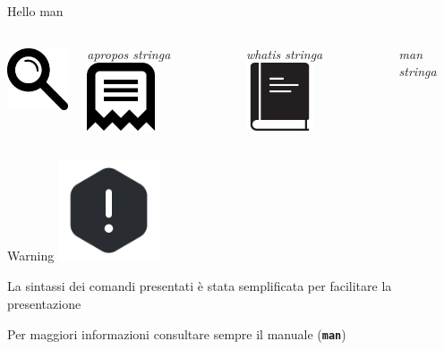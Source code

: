 \documentclass{beamer}
\begin{document}
    \begin{frame}{Hello man}
        \begin{columns}[t, onlytextwidth]
                \centering
                \includegraphics[height=2cm]{images/search.pdf}

                \vspace{0.2cm}

                \textit{apropos stringa}
                \centering
                \includegraphics[height=2cm]{images/whatis.pdf}

                \vspace{0.2cm}

                \textit{whatis stringa}
                \centering
                \includegraphics[height=2cm]{images/man.pdf}

                \vspace{0.2cm}

                \textit{man stringa}
        \end{columns}
    \end{frame}

    \begin{frame}{Warning}
        \centering
        \includegraphics[height=3cm, keepaspectratio]{images/warning.pdf}

        \vspace{0.5cm}

        \Large La sintassi dei comandi presentati è stata semplificata per facilitare la presentazione

        \vspace{0.5cm}

        \small Per maggiori informazioni consultare sempre il manuale (\texttt{\textbf{man}})
    \end{frame}
\end{document}
